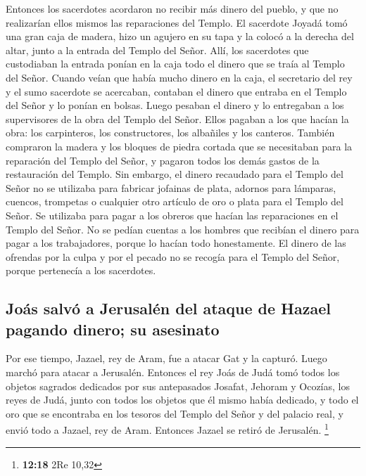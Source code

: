  Entonces los sacerdotes acordaron no recibir más dinero
del pueblo, y que no realizarían ellos mismos las reparaciones del
Templo.  El sacerdote Joyadá tomó una gran caja de madera,
hizo un agujero en su tapa y la colocó a la derecha del altar, junto a
la entrada del Templo del Señor. Allí, los sacerdotes que custodiaban la
entrada ponían en la caja todo el dinero que se traía al Templo del
Señor.  Cuando veían que había mucho dinero en la caja,
el secretario del rey y el sumo sacerdote se acercaban, contaban el
dinero que entraba en el Templo del Señor y lo ponían en bolsas.
 Luego pesaban el dinero y lo entregaban a los
supervisores de la obra del Templo del Señor. Ellos pagaban a los que
hacían la obra: los carpinteros, los constructores, los 
albañiles y los canteros. También compraron la madera y los bloques de
piedra cortada que se necesitaban para la reparación del Templo del
Señor, y pagaron todos los demás gastos de la restauración del Templo.
 Sin embargo, el dinero recaudado para el Templo del
Señor no se utilizaba para fabricar jofainas de plata, adornos para
lámparas, cuencos, trompetas o cualquier otro artículo de oro o plata
para el Templo del Señor.  Se utilizaba para pagar a los
obreros que hacían las reparaciones en el Templo del Señor.
 No se pedían cuentas a los hombres que recibían el
dinero para pagar a los trabajadores, porque lo hacían todo
honestamente.  El dinero de las ofrendas por la culpa y
por el pecado no se recogía para el Templo del Señor, porque pertenecía
a los sacerdotes.

\hypertarget{jouxe1s-salvuxf3-a-jerusaluxe9n-del-ataque-de-hazael-pagando-dinero-su-asesinato}{%
\subsection{Joás salvó a Jerusalén del ataque de Hazael pagando dinero;
su
asesinato}\label{jouxe1s-salvuxf3-a-jerusaluxe9n-del-ataque-de-hazael-pagando-dinero-su-asesinato}}

 Por ese tiempo, Jazael, rey de Aram, fue a atacar Gat y
la capturó. Luego marchó para atacar a Jerusalén. 
Entonces el rey Joás de Judá tomó todos los objetos sagrados dedicados
por sus antepasados Josafat, Jehoram y Ocozías, los reyes de Judá, junto
con todos los objetos que él mismo había dedicado, y todo el oro que se
encontraba en los tesoros del Templo del Señor y del palacio real, y
envió todo a Jazael, rey de Aram. Entonces Jazael se retiró de
Jerusalén. \footnote{\textbf{12:18} 2Re 10,32}

